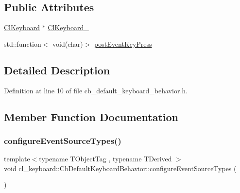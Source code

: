 \subsection*{Public Attributes}
\begin{DoxyCompactItemize}
\item 
\hyperlink{classcl__keyboard_1_1ClKeyboard}{Cl\+Keyboard} $\ast$ \hyperlink{classcl__keyboard_1_1CbDefaultKeyboardBehavior_a482e94248b8e6fbac0973d3dec0cc20b}{Cl\+Keyboard\+\_\+}
\item 
std\+::function$<$ void(char)$>$ \hyperlink{classcl__keyboard_1_1CbDefaultKeyboardBehavior_abd29833a0f94aa1d5aa1834d15ab1281}{post\+Event\+Key\+Press}
\end{DoxyCompactItemize}


\subsection{Detailed Description}


Definition at line 10 of file cb\+\_\+default\+\_\+keyboard\+\_\+behavior.\+h.



\subsection{Member Function Documentation}
\mbox{\label{classcl__keyboard_1_1CbDefaultKeyboardBehavior_a6801e961040358ab8fb547ca7e113082}} 
\subsubsection{\texorpdfstring{configure\+Event\+Source\+Types()}{configureEventSourceTypes()}}
{\footnotesize\ttfamily template$<$typename T\+Object\+Tag , typename T\+Derived $>$ \\
void cl\+\_\+keyboard\+::\+Cb\+Default\+Keyboard\+Behavior\+::configure\+Event\+Source\+Types (\begin{DoxyParamCaption}{ }\end{DoxyParamCaption})\hspace{0.3cm}{\ttfamily [inline]}}



